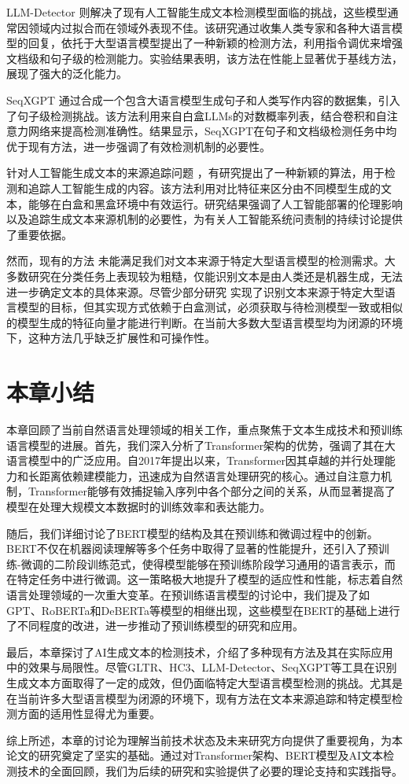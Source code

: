 LLM-Detector \cite{wang_llm-detector_2024} 则解决了现有人工智能生成文本检测模型面临的挑战，这些模型通常因领域内过拟合而在领域外表现不佳。该研究通过收集人类专家和各种大语言模型的回复，依托于大型语言模型提出了一种新颖的检测方法，利用指令调优来增强文档级和句子级的检测能力。实验结果表明，该方法在性能上显著优于基线方法，展现了强大的泛化能力。

SeqXGPT \cite{wang_seqxgpt_2023} 通过合成一个包含大语言模型生成句子和人类写作内容的数据集，引入了句子级检测挑战。该方法利用来自白盒LLMs的对数概率列表，结合卷积和自注意力网络来提高检测准确性。结果显示，SeqXGPT在句子和文档级检测任务中均优于现有方法，进一步强调了有效检测机制的必要性。

针对人工智能生成文本的来源追踪问题 \cite{li_origin_2023}，有研究提出了一种新颖的算法，用于检测和追踪人工智能生成的内容。该方法利用对比特征来区分由不同模型生成的文本，能够在白盒和黑盒环境中有效运行。研究结果强调了人工智能部署的伦理影响以及追踪生成文本来源机制的必要性，为有关人工智能系统问责制的持续讨论提供了重要依据。

然而，现有的方法 \cite{gehrmann_gltr_2019, guo_how_2023, wang_llm-detector_2024, wang_seqxgpt_2023} 未能满足我们对文本来源于特定大型语言模型的检测需求。大多数研究在分类任务上表现较为粗糙，仅能识别文本是由人类还是机器生成，无法进一步确定文本的具体来源。尽管少部分研究 \cite{li_origin_2023} 实现了识别文本来源于特定大型语言模型的目标，但其实现方式依赖于白盒测试，必须获取与待检测模型一致或相似的模型生成的特征向量才能进行判断。在当前大多数大型语言模型均为闭源的环境下，这种方法几乎缺乏扩展性和可操作性。

\section{本章小结}
\label{sec:rw-conclusion}

本章回顾了当前自然语言处理领域的相关工作，重点聚焦于文本生成技术和预训练语言模型的进展。首先，我们深入分析了Transformer架构的优势，强调了其在大语言模型中的广泛应用。自2017年提出以来，Transformer因其卓越的并行处理能力和长距离依赖建模能力，迅速成为自然语言处理研究的核心。通过自注意力机制，Transformer能够有效捕捉输入序列中各个部分之间的关系，从而显著提高了模型在处理大规模文本数据时的训练效率和表达能力。

随后，我们详细讨论了BERT模型的结构及其在预训练和微调过程中的创新。BERT不仅在机器阅读理解等多个任务中取得了显著的性能提升，还引入了预训练-微调的二阶段训练范式，使得模型能够在预训练阶段学习通用的语言表示，而在特定任务中进行微调。这一策略极大地提升了模型的适应性和性能，标志着自然语言处理领域的一次重大变革。在预训练语言模型的讨论中，我们提及了如GPT、RoBERTa和DeBERTa等模型的相继出现，这些模型在BERT的基础上进行了不同程度的改进，进一步推动了预训练模型的研究和应用。

最后，本章探讨了AI生成文本的检测技术，介绍了多种现有方法及其在实际应用中的效果与局限性。尽管GLTR、HC3、LLM-Detector、SeqXGPT等工具在识别生成文本方面取得了一定的成效，但仍面临特定大型语言模型检测的挑战。尤其是在当前许多大型语言模型为闭源的环境下，现有方法在文本来源追踪和特定模型检测方面的适用性显得尤为重要。

综上所述，本章的讨论为理解当前技术状态及未来研究方向提供了重要视角，为本论文的研究奠定了坚实的基础。通过对Transformer架构、BERT模型及AI文本检测技术的全面回顾，我们为后续的研究和实验提供了必要的理论支持和实践指导。